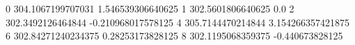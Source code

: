 0 304.1067199707031 1.546539306640625
1 302.5601806640625 0.0
2 302.3492126464844 -0.210968017578125
4 305.7144470214844 3.154266357421875
6 302.84271240234375 0.28253173828125
8 302.1195068359375 -0.440673828125
